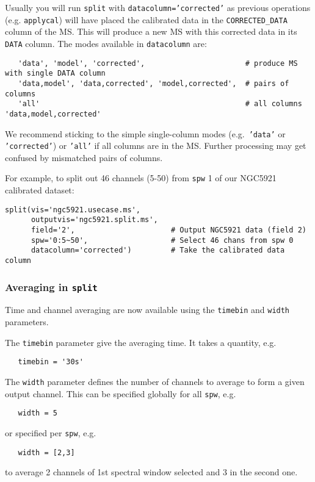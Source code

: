 Usually you will run {\tt split} with {\tt datacolumn='corrected'} as
previous operations (e.g. {\tt applycal}) will have placed the
calibrated data in the {\tt CORRECTED\_DATA} column of the MS.  This
will produce a new MS with this corrected data in its {\tt DATA} 
column.  The modes available in {\tt datacolumn} are:
\small
\begin{verbatim}
   'data', 'model', 'corrected',                       # produce MS with single DATA column
   'data,model', 'data,corrected', 'model,corrected',  # pairs of columns
   'all'                                               # all columns 'data,model,corrected'
\end{verbatim}
\normalsize
We recommend sticking to the simple single-column modes (e.g.\ 
{\tt 'data'} or {\tt 'corrected'}) or {\tt 'all'} if all columns are in
the MS.  Further processing may get confused by mismatched pairs of columns.

For example, to split out 46 channels (5-50) from {\tt spw} 1 of
our NGC5921 calibrated dataset:
\small
\begin{verbatim}
split(vis='ngc5921.usecase.ms',       
      outputvis='ngc5921.split.ms',    
      field='2',                      # Output NGC5921 data (field 2)
      spw='0:5~50',                   # Select 46 chans from spw 0
      datacolumn='corrected')         # Take the calibrated data column
\end{verbatim}
\normalsize

\subsubsection{Averaging in {\tt split}}
\label{section:cal.other.split.average}

Time and channel averaging are now available using the {\tt timebin}
and {\tt width} parameters.

The {\tt timebin} parameter give the averaging time.  It takes a
quantity, e.g.
\small
\begin{verbatim}
   timebin = '30s'
\end{verbatim}
\normalsize

The {\tt width} parameter defines the number of channels to average to
form a given output channel.  This can be specified globally for all
{\tt spw}, e.g.
\small
\begin{verbatim}
   width = 5
\end{verbatim}
\normalsize
or specified per {\tt spw}, e.g.
\small
\begin{verbatim}
   width = [2,3]
\end{verbatim}
\normalsize
to average 2 channels of 1st spectral window selected and 3 in the 
second one.

